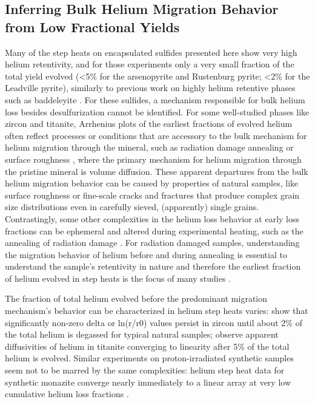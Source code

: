 \subsection{Inferring Bulk Helium Migration Behavior from Low Fractional
Yields}\label{ch3-low-fractional-yields}

Many of the step heats on encapsulated sulfides presented here show very
high helium retentivity, and for those experiments only a very small
fraction of the total yield evolved (\textless5\% for the arsenopyrite
and Rustenburg pyrite; \textless2\% for the Leadville pyrite), similarly
to previous work on highly helium retentive phases such as baddeleyite
\citep{baughmanflowers2018}. For these sulfides, a
mechanism responsible for bulk helium loss besides desulfurization
cannot be identified. For some well-studied phases like zircon and
titanite, Arrhenius plots of the earliest fractions of evolved helium
often reflect processes or conditions that are accessory to the bulk
mechanism for helium migration through the mineral, such as radiation
damage annealing or surface roughness \citep{reinersfarley1999,
guenthner2013}, where the primary mechanism for helium
migration through the pristine mineral is volume diffusion. These
apparent departures from the bulk helium migration behavior can be
caused by properties of natural samples, like surface roughness or
fine-scale cracks and fractures \citep{reinersfarley1999} that produce
complex grain size distributions even in carefully sieved, (apparently)
single grains. Contrastingly, some other complexities in the helium loss
behavior at early loss fractions can be ephemeral and altered during
experimental heating, such as the annealing of radiation damage \citep{shusterfarley2009}. For radiation damaged samples, understanding the
migration behavior of helium before and during annealing is essential to
understand the sample's retentivity in nature and
therefore the earliest fraction of helium evolved in step heats is the
focus of many studies \citep{shusterfarley2009,flowers2009,flowers2007,shuster2006}.

The fraction of total helium evolved before the predominant migration
mechanism's behavior can be characterized in helium step heats varies:
\citet{guenthner2013} show that significantly non-zero delta or
ln(r/r0) values persist in zircon until about 2\% of the total helium is
degassed for typical natural samples; \citet{reinersfarley1999} observe
apparent diffusivities of helium in titanite converging to linearity
after 5\% of the total helium is evolved. Similar experiments
on proton-irradiated synthetic samples seem not to be marred by the same
complexities: helium step heat data for synthetic monazite converge
nearly immediately to a linear array at very low cumulative helium loss
fractions \citep{farley2007}.

